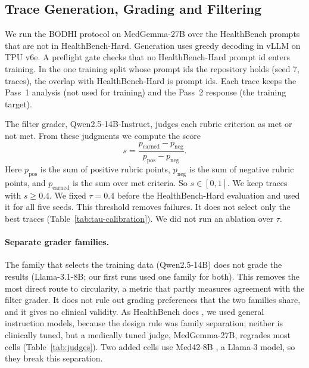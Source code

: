 \documentclass{article}
\newcommand{\bodhi}{BODHI}
\newcommand{\hbhard}{HealthBench-Hard}
\begin{document}
\subsection{Trace Generation, Grading and Filtering}

We run the \bodhi{} protocol on MedGemma-27B over the \statHBMedGemmaMayFilterRaw{} HealthBench prompts that
are not in \hbhard{}. Generation uses greedy decoding in vLLM \citep{kwon2023efficient} on TPU
v6e. A preflight gate checks that no \hbhard{} prompt id enters training. In the one training split
whose prompt ids the repository holds (seed 7, \statHBMedGemmaMayFilterTrainSplit{} traces), the overlap with \hbhard{} is
\statHBMedGemmaMayFilterTrainOverlap{} prompt ids. Each trace keeps the Pass~1 analysis
(not used for training) and the Pass~2 response (the training target).

The filter grader, Qwen2.5-14B-Instruct, judges each rubric criterion as met or not met. From
these judgments we compute the score
\begin{equation}
    s = \frac{p_{\text{earned}} - p_{\text{neg}}}{p_{\text{pos}} - p_{\text{neg}}}.
    \label{eq:score}
\end{equation}
Here $p_{\text{pos}}$ is the sum of positive rubric points, $p_{\text{neg}}$ is the sum of
negative rubric points, and $p_{\text{earned}}$ is the sum over met criteria. So $s\in[0,1]$. We
keep traces with $s \geq 0.4$. We fixed $\tau = 0.4$ before the \hbhard{} evaluation and used it
for all five seeds. This threshold removes failures. It does not select only the best traces
(Table~\ref{tab:tau-calibration}). We did not run an ablation over $\tau$.

\paragraph{Separate grader families.} The family that selects the training data (Qwen2.5-14B) does
not grade the results (Llama-3.1-8B; our first runs used one family for both). This removes the
most direct route to circularity, a metric that partly measures agreement with the filter grader.
It does not rule out grading preferences that the two families share, and it gives no clinical
validity. As HealthBench does \citep{healthbench2025}, we used general instruction models, because
the design rule was family separation; neither is clinically tuned, but a medically tuned judge,
MedGemma-27B, regrades most cells (Table~\ref{tab:judges}). Two added cells
use Med42-8B \citep{christophe2024med42}, a Llama-3 model, so they break this separation.
\end{document}
